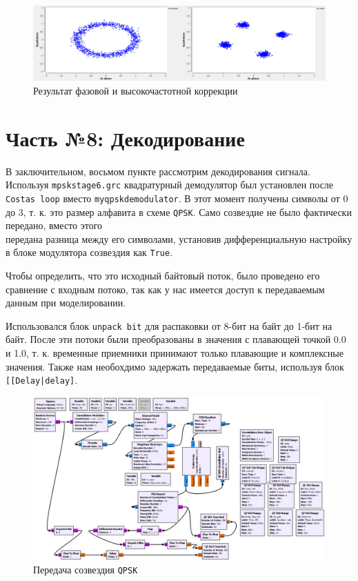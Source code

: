 \documentclass[a4paper]{article}
\begin{document}
            \begin{figure}[H]
                \centering
                \includegraphics[width=\textwidth]{img/p7_3.png}
                \caption{Результат фазовой и высокочастотной коррекции}
                \label{fig:p7_3}
            \end{figure}
            
    \newpage
        \section{Часть №8: Декодирование}
            В заключительном, восьмом пункте рассмотрим декодирования сигнала. Используя \texttt{mpskstage6.grc} квадратурный демодулятор был установлен после \\\texttt{Costas loop} вместо \texttt{myqpskdemodulator}. В этот момент получены символы от 0 до 3, т. к. это размер алфавита в схеме \texttt{QPSK}. Само созвездие не было фактически передано, вместо этого \\передана разница между его символами, установив дифференциальную настройку в блоке модулятора созвездия как \texttt{True}. 
            
            Чтобы определить, что это исходный байтовый поток, было проведено его сравнение с входным потоко, так как у нас имеется доступ к передаваемым данным при моделировании. 
            
            Использовался блок \texttt{unpack bit} для распаковки от 8-бит на байт до 1-бит на байт. После эти потоки были преобразованы в значения с плавающей точкой 0.0 и 1.0, т. к. временные приемники принимают только плавающие и комплексные значения. Также нам необохдимо задержать передаваемые биты, используя блок \texttt{[[Delay|delay]}.

             \begin{figure}[H]
                \centering
                \includegraphics[width=\textwidth]{img/p8_1.png}
                \caption{Передача созвездия \texttt{QPSK}}
                \label{fig:p8_1}
            \end{figure}
            
\end{document}
